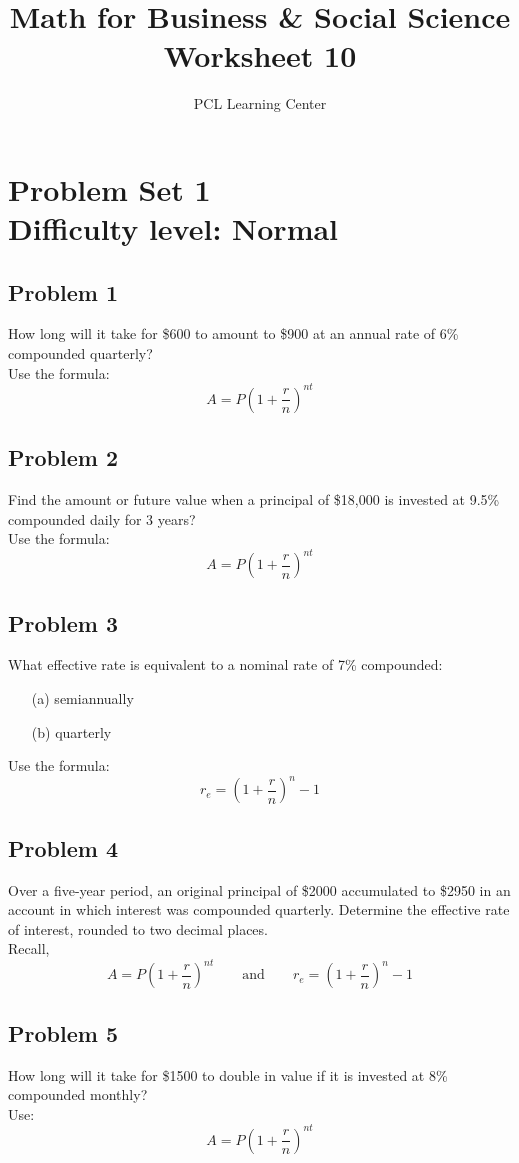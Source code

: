 \documentclass[12pt]{article}
\title{Math for Business \& Social Science\\ Worksheet 10}
\author{PCL Learning Center}
\date{}
\begin{document}
\maketitle

\section*{Problem Set 1\\Difficulty level: Normal}
\subsection*{Problem 1}
How long will it take for \$600 to amount to \$900 at an annual rate of 6\% compounded quarterly?\\
Use the formula:
\[
A = P\left(1 + \frac{r}{n} \right)^{nt}
\]

\subsection*{Problem 2}
Find the amount or future value when a principal of \$18{,}000 is invested at 9.5\% compounded daily for 3 years?\\
Use the formula:
\[
A = P\left(1 + \frac{r}{n} \right)^{nt}
\]

\subsection*{Problem 3}
What effective rate is equivalent to a nominal rate of 7\% compounded:
\begin{itemize}
    \item[(a)] semiannually
    \item[(b)] quarterly
\end{itemize}
Use the formula:
\[
r_e = \left(1 + \frac{r}{n} \right)^n - 1
\]

\subsection*{Problem 4}
Over a five-year period, an original principal of \$2000 accumulated to \$2950 in an account in which interest was compounded quarterly. Determine the effective rate of interest, rounded to two decimal places.\\
Recall,
\[
A = P\left(1 + \frac{r}{n} \right)^{nt}
\qquad \text{and} \qquad
r_e = \left(1 + \frac{r}{n} \right)^n - 1
\]

\subsection*{Problem 5}
How long will it take for \$1500 to double in value if it is invested at 8\% compounded monthly?\\
Use:
\[
A = P\left(1 + \frac{r}{n} \right)^{nt}
\]
\end{document}
